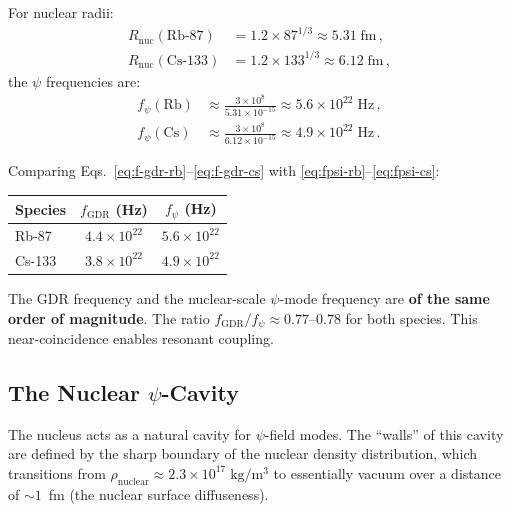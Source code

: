 \documentclass[aps,prd,twocolumn,superscriptaddress,nofootinbib]{revtex4-2}
\newcommand{\ee}[1]{\times 10^{#1}}
\newcommand{\Rnuc}{R_{\mathrm{nuc}}}
\newcommand{\fGDR}{f_{\mathrm{GDR}}}
\newcommand{\fpsi}{f_\psi}
\begin{document}
For nuclear radii:
\begin{align}
\Rnuc(\text{Rb-87}) &= 1.2 \times 87^{1/3} \approx 5.31\;\mathrm{fm}\,,\\
\Rnuc(\text{Cs-133}) &= 1.2 \times 133^{1/3} \approx 6.12\;\mathrm{fm}\,,
\end{align}
the $\psi$ frequencies are:
\begin{align}
\fpsi(\text{Rb}) &\approx \frac{3\ee{8}}{5.31\ee{-15}}
\approx 5.6\ee{22}\;\mathrm{Hz}\,,
\label{eq:fpsi-rb}\\
\fpsi(\text{Cs}) &\approx \frac{3\ee{8}}{6.12\ee{-15}}
\approx 4.9\ee{22}\;\mathrm{Hz}\,.
\label{eq:fpsi-cs}
\end{align}

\begin{tcolorbox}[colback=green!5!white, colframe=green!50!black,
title=Key Frequency Coincidence]
Comparing Eqs.~\eqref{eq:f-gdr-rb}--\eqref{eq:f-gdr-cs} with
\eqref{eq:fpsi-rb}--\eqref{eq:fpsi-cs}:
\begin{center}
\renewcommand{\arraystretch}{1.3}
\begin{tabular}{lcc}
\toprule
Species & $\fGDR$ (Hz) & $\fpsi$ (Hz) \\
\midrule
Rb-87  & $4.4\ee{22}$ & $5.6\ee{22}$ \\
Cs-133 & $3.8\ee{22}$ & $4.9\ee{22}$ \\
\bottomrule
\end{tabular}
\end{center}
The GDR frequency and the nuclear-scale $\psi$-mode frequency are
\textbf{of the same order of magnitude}.  The ratio
$\fGDR/\fpsi \approx 0.77$--$0.78$ for both species.
This near-coincidence enables resonant coupling.
\end{tcolorbox}

\subsection{The Nuclear $\psi$-Cavity}
\label{sec:cavity}

The nucleus acts as a natural cavity for $\psi$-field modes.  The
``walls'' of this cavity are defined by the sharp boundary of the
nuclear density distribution, which transitions from
$\rho_{\mathrm{nuclear}} \approx 2.3\ee{17}\;\mathrm{kg/m^3}$ to
essentially vacuum over a distance of $\sim\!1$~fm (the nuclear
surface diffuseness).
\end{document}
